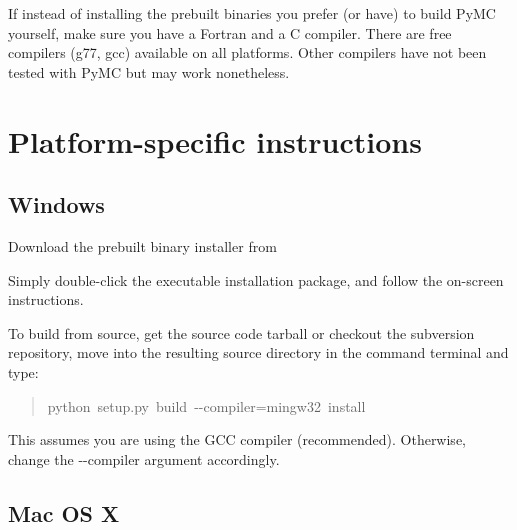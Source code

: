 If instead of installing the prebuilt binaries you prefer (or have) to build PyMC
yourself, make sure you have a Fortran and a C compiler. There are free
compilers (g77, gcc) available on all platforms. Other compilers have not been
tested with PyMC but may work nonetheless.



\hypertarget{platform-specific-instructions}{}
\section*{Platform-specific instructions}
\label{platform-specific-instructions}



\hypertarget{windows}{}
\subsection*{Windows}
\label{windows}
\begin{list}{.}
{
\setlength{\rightmargin}{\leftmargin}
}
\item {} 
Download the prebuilt binary installer from

\item {} 
Simply double-click the executable installation package, and follow the on-screen instructions.

\end{list}

To build from source, get the source code tarball or checkout the subversion
repository, move into the resulting source directory in the command terminal
and type:
\begin{quote}{\ttfamily \raggedright \noindent
python~setup.py~build~-{}-compiler=mingw32~install
}\end{quote}

This assumes you are using the GCC compiler (recommended). Otherwise,
change the -{}-compiler argument accordingly.



\hypertarget{mac-os-x}{}
\subsection*{Mac OS X}
\label{mac-os-x}

